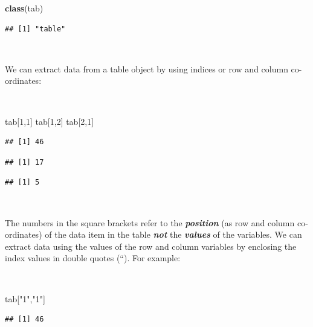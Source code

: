 \documentclass[12pt,a4paper]{book}
\newenvironment{Shaded}{\begin{snugshade}}{\end{snugshade}}
\newcommand{\KeywordTok}[1]{\textcolor[rgb]{0.13,0.29,0.53}{\textbf{#1}}}
\newcommand{\DecValTok}[1]{\textcolor[rgb]{0.00,0.00,0.81}{#1}}
\newcommand{\StringTok}[1]{\textcolor[rgb]{0.31,0.60,0.02}{#1}}
\newcommand{\NormalTok}[1]{#1}
\theoremstyle{definition}
\theoremstyle{definition}
\theoremstyle{definition}
\theoremstyle{remark}
\begin{document}
\begin{Shaded}
\begin{Highlighting}[]
\KeywordTok{class}\NormalTok{(tab)}
\end{Highlighting}
\end{Shaded}

\begin{verbatim}
## [1] "table"
\end{verbatim}

~

We can extract data from a table object by using indices or row and
column co-ordinates:

~

\begin{Shaded}
\begin{Highlighting}[]
\NormalTok{tab[}\DecValTok{1}\NormalTok{,}\DecValTok{1}\NormalTok{]}
\NormalTok{tab[}\DecValTok{1}\NormalTok{,}\DecValTok{2}\NormalTok{]}
\NormalTok{tab[}\DecValTok{2}\NormalTok{,}\DecValTok{1}\NormalTok{]}
\end{Highlighting}
\end{Shaded}

\begin{verbatim}
## [1] 46
\end{verbatim}

\begin{verbatim}
## [1] 17
\end{verbatim}

\begin{verbatim}
## [1] 5
\end{verbatim}

~

The numbers in the square brackets refer to the \textbf{\emph{position}}
(as row and column co-ordinates) of the data item in the table
\textbf{\emph{not}} the \textbf{\emph{values}} of the variables. We can
extract data using the values of the row and column variables by
enclosing the index values in double quotes (``). For example:

~

\begin{Shaded}
\begin{Highlighting}[]
\NormalTok{tab[}\StringTok{"1"}\NormalTok{,}\StringTok{"1"}\NormalTok{]}
\end{Highlighting}
\end{Shaded}

\begin{verbatim}
## [1] 46
\end{verbatim}
\end{document}
